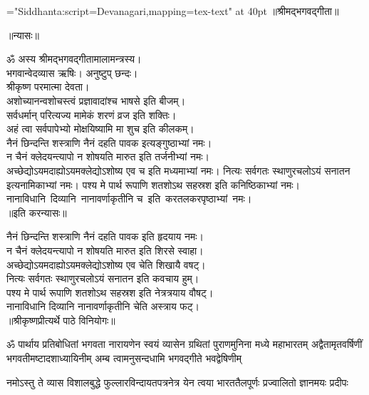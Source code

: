 \centerline{\font\x="Siddhanta:script=Devanagari,mapping=tex-text" at 40pt \x ॥श्रीमद्भगवद्गीता॥}
\bigskip
\centerline{\Large ॥न्यासः॥}
\medskip
{}
ॐ अस्य श्रीमद्भगवद्गीतामालामन्त्रस्य।\\
भगवान्वेदव्यास ऋषिः। अनुष्टुप् छन्दः।\\
श्रीकृष्ण परमात्मा देवता।\\
अशोच्यानन्वशोचस्त्वं प्रज्ञावादांश्च भाषसे इति बीजम्।\\
सर्वधर्मान् परित्यज्य मामेकं शरणं व्रज इति शक्तिः।\\
अहं त्वा सर्वपापेभ्यो मोक्षयिष्यामि मा शुच इति कीलकम्।\\
नैनं छिन्दन्ति शस्त्राणि नैनं दहति पावक इत्यङ्गुष्ठाभ्यां नमः।\\
न चैनं क्लेदयन्त्यापो न शोषयति मारुत इति तर्जनीभ्यां नमः।\\
अच्छेद्योऽयमदाह्योऽयमक्लेद्योऽशोष्य एव च इति मध्यमाभ्यां नमः। नित्यः सर्वगतः स्थाणुरचलोऽयं सनातन इत्यनामिकाभ्यां नमः। पश्य मे पार्थ रूपाणि शतशोऽथ सहस्रश इति कनिष्ठिकाभ्यां नमः। नानाविधानि~दिव्यानि~नानावर्णाकृतीनि च~इति~करतलकरपृष्ठाभ्यां~नमः।\\
{॥इति करन्यासः॥}

\medskip

नैनं छिन्दन्ति शस्त्राणि नैनं दहति पावक इति हृदयाय नमः।\\
न चैनं क्लेदयन्त्यापो न शोषयति मारुत इति शिरसे स्वाहा।\\
अच्छेद्योऽयमदाह्योऽयमक्लेद्योऽशोष्य एव चेति शिखायै वषट्।\\
नित्यः सर्वगतः स्थाणुरचलोऽयं सनातन इति कवचाय हुम्।\\
पश्य मे पार्थ रूपाणि शतशोऽथ सहस्रश इति नेत्रत्रयाय वौषट्।\\
नानाविधानि दिव्यानि नानावर्णाकृतीनि चेति अस्त्राय फट्।\\
{॥श्रीकृष्णप्रीत्यर्थे पाठे विनियोगः॥}
\vfill

\begin{minipage}{\linewidth}

\fourlineindentedshloka
{ॐ पार्थाय प्रतिबोधितां भगवता नारायणेन स्वयं}
{व्यासेन ग्रथितां पुराणमुनिना मध्ये महाभारतम्}
{अद्वैतामृतवर्षिणीं भगवतीमष्टादशाध्यायिनीम्}
{अम्ब त्वामनुसन्दधामि भगवद्गीते भवद्वेषिणीम्}%
\end{minipage}

\twolineshloka
{नमोऽस्तु ते व्यास विशालबुद्धे फुल्लारविन्दायतपत्रनेत्र}
{येन त्वया भारततैलपूर्णः प्रज्वालितो ज्ञानमयः प्रदीपः}%

